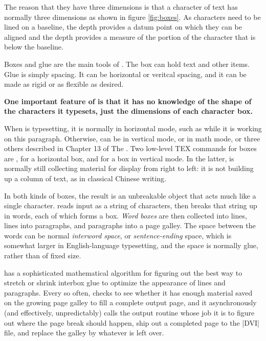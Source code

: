 The reason that they have three dimensions is that a character of text has normally three dimensions as shown in figure \ref{fig:boxes}. As characters need to be lined on a baseline, the depth provides a datum point on which they can be aligned and the depth provides a measure of the portion of the character that is below the baseline.


Boxes and glue are the main tools of \tex. The box can hold text and other items. Glue is simply spacing. It can be horizontal or veritcal spacing, and it can be made as rigid or as flexible as desired.



\begin{minipage}{\linewidth}
\textbf{One important feature of \tex is that it has no knowledge of the shape of the characters it typesets, just the dimensions of each character box.}
\end{minipage}
\medskip

When \tex is typesetting, it is normally in horizontal mode, such as while
it is working on this paragraph. Otherwise, \tex can be in vertical mode, or
in math mode, or three others described in Chapter 13 of The \texbook.
Two low-level TEX commands for boxes are , for a horizontal box,
and  for a box in vertical mode. In the latter, \tex is normally still
collecting material for display from right to left: it is not building up a
column of text, as in classical Chinese writing.

In both kinds of boxes, the result is an unbreakable object that acts
much like a single character. \tex reads input as a string of characters,
then breaks that string up in words, each of which forms a box. 
\emph{Word boxes}
are then collected into lines, lines into paragraphs, and paragraphs into a
page galley. The space between the words can be normal \emph{interword space},
or \emph{sentence-ending} space, which is somewhat larger in English-language
typesetting, and the space is normally glue, rather than of fixed size.

\tex has a sophisticated mathematical algorithm for figuring out the
best way to stretch or shrink interbox glue to optimize the appearance of
lines and paragraphs. Every so often, \tex checks to see whether it has
enough material saved on the growing page galley to fill a complete output
page, and it asynchronously (and effectively, unpredictably) calls the
output routine whose job it is to figure out where the page break should
happen, ship out a completed page to the |DVI|  file, and replace the galley by
whatever is left over.

